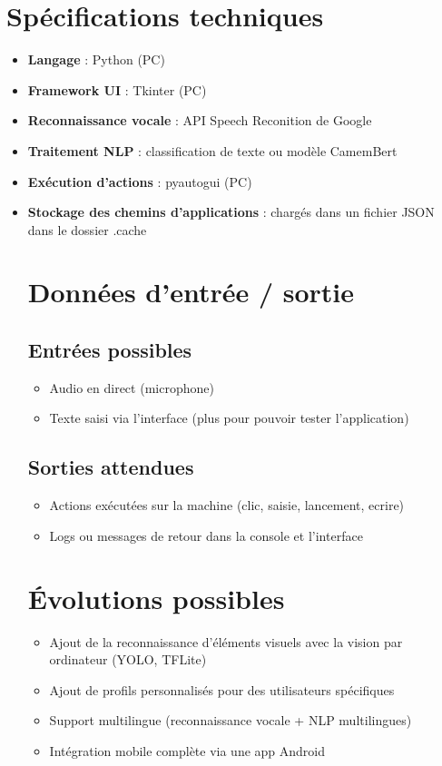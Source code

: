 \documentclass[12pt]{article}
\begin{document}
	\section{Spécifications techniques}
	\begin{itemize}
		\item \textbf{Langage} : Python (PC)
		\item \textbf{Framework UI} : Tkinter (PC)
		\item \textbf{Reconnaissance vocale} : API Speech Reconition de Google
		\item \textbf{Traitement NLP} : classification de texte ou modèle CamemBert
		\item \textbf{Exécution d’actions} : pyautogui (PC)
		\item \textbf{Stockage des chemins d'applications} : chargés dans un fichier JSON dans le dossier .cache
	
	\section{Données d’entrée / sortie}
	\subsection{Entrées possibles}
	\begin{itemize}
		\item Audio en direct (microphone)
		\item Texte saisi via l’interface (plus pour pouvoir tester l'application)
	\end{itemize}
	
	\subsection{Sorties attendues}
	\begin{itemize}
		\item Actions exécutées sur la machine (clic, saisie, lancement, ecrire)
		\item Logs ou messages de retour dans la console et l’interface
	\end{itemize}
	
	\section{Évolutions possibles}
	\begin{itemize}
		\item Ajout de la reconnaissance d’éléments visuels avec la vision par ordinateur (YOLO, TFLite)
		\item Ajout de profils personnalisés pour des utilisateurs spécifiques
		\item Support multilingue (reconnaissance vocale + NLP multilingues)
		\item Intégration mobile complète via une app Android
	\end{itemize}
	

\end{itemize}
\end{document}
